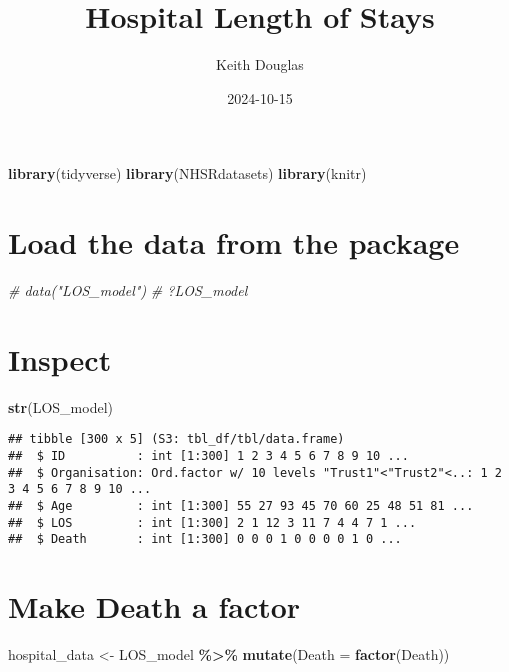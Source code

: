 \documentclass[
]{article}
\title{Hospital Length of Stays}
\author{Keith Douglas}
\date{2024-10-15}
\newenvironment{Shaded}{\begin{snugshade}}{\end{snugshade}}
\newcommand{\AttributeTok}[1]{\textcolor[rgb]{0.13,0.29,0.53}{#1}}
\newcommand{\CommentTok}[1]{\textcolor[rgb]{0.56,0.35,0.01}{\textit{#1}}}
\newcommand{\FunctionTok}[1]{\textcolor[rgb]{0.13,0.29,0.53}{\textbf{#1}}}
\newcommand{\NormalTok}[1]{#1}
\newcommand{\OtherTok}[1]{\textcolor[rgb]{0.56,0.35,0.01}{#1}}
\newcommand{\SpecialCharTok}[1]{\textcolor[rgb]{0.81,0.36,0.00}{\textbf{#1}}}
\begin{document}
\maketitle

\begin{Shaded}
\begin{Highlighting}[]
\FunctionTok{library}\NormalTok{(tidyverse)}
\FunctionTok{library}\NormalTok{(NHSRdatasets)}
\FunctionTok{library}\NormalTok{(knitr)}
\end{Highlighting}
\end{Shaded}

\section{Load the data from the
package}\label{load-the-data-from-the-package}

\begin{Shaded}
\begin{Highlighting}[]
\CommentTok{\# data("LOS\_model")}
\CommentTok{\# ?LOS\_model}
\end{Highlighting}
\end{Shaded}

\section{Inspect}\label{inspect}

\begin{Shaded}
\begin{Highlighting}[]
\FunctionTok{str}\NormalTok{(LOS\_model)}
\end{Highlighting}
\end{Shaded}

\begin{verbatim}
## tibble [300 x 5] (S3: tbl_df/tbl/data.frame)
##  $ ID          : int [1:300] 1 2 3 4 5 6 7 8 9 10 ...
##  $ Organisation: Ord.factor w/ 10 levels "Trust1"<"Trust2"<..: 1 2 3 4 5 6 7 8 9 10 ...
##  $ Age         : int [1:300] 55 27 93 45 70 60 25 48 51 81 ...
##  $ LOS         : int [1:300] 2 1 12 3 11 7 4 4 7 1 ...
##  $ Death       : int [1:300] 0 0 0 1 0 0 0 0 1 0 ...
\end{verbatim}

\section{Make Death a factor}\label{make-death-a-factor}

\begin{Shaded}
\begin{Highlighting}[]
\NormalTok{hospital\_data }\OtherTok{\textless{}{-}}\NormalTok{ LOS\_model }\SpecialCharTok{\%\textgreater{}\%} 
                  \FunctionTok{mutate}\NormalTok{(}\AttributeTok{Death =} \FunctionTok{factor}\NormalTok{(Death))}
\end{Highlighting}
\end{Shaded}
\end{document}
